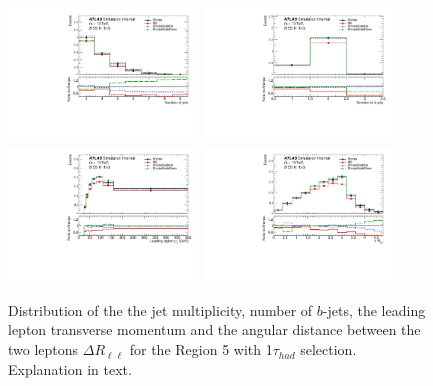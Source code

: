 \begin{figure}[!htb]
\centering
\includegraphics[width=0.45\textwidth]{Plots/ttV/generator/c_Region_4_nJets}
\includegraphics[width=0.45\textwidth]{Plots/ttV/generator/c_Region_4_nBtagJets}\\
\includegraphics[width=0.45\textwidth]{Plots/ttV/generator/c_Region_4_lep_Pt_0} 
\includegraphics[width=0.45\textwidth]{Plots/ttV/generator/c_Region_4_DRll01}\\
  \caption{Distribution of the the jet multiplicity, number of $b$-jets, the leading lepton transverse momentum and the angular distance between the two leptons  $\Delta R _{\ell \ell }$ for the Region 5 with 1$\tau_{had}$ selection. Explanation in text.
   \label{ttV:tauR_kin}}
\end{figure}
% 
